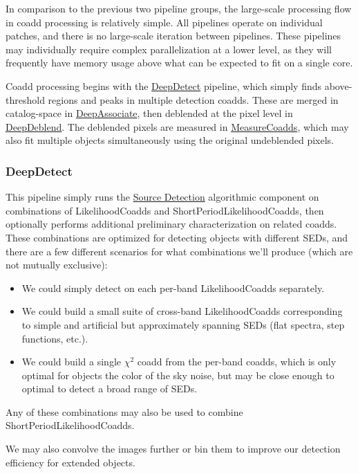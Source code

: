 In comparison to the previous two pipeline groups, the large-scale processing flow in coadd processing is relatively simple.  All pipelines operate on individual patches, and there is no large-scale iteration between pipelines.  These pipelines may individually require complex parallelization at a lower level, as they will frequently have memory usage above what can be expected to fit on a single core.

Coadd processing begins with the \hyperref[sec:drpDeepDetect]{DeepDetect} pipeline, which simply finds above-threshold regions and peaks in multiple detection coadds.  These are merged in catalog-space in \hyperref[sec:drpDeepAssociate]{DeepAssociate}, then deblended at the pixel level in \hyperref[sec:drpDeepDeblend]{DeepDeblend}.  The deblended pixels are measured in \hyperref[sec:drpMeasureCoadds]{MeasureCoadds}, which may also fit multiple objects simultaneously using the original undeblended pixels.

\subsubsection{DeepDetect}
\label{sec:drpDeepDetect}

This pipeline simply runs the \hyperref[sec:acSourceDetection]{Source Detection} algorithmic component on combinations of LikelihoodCoadds and ShortPeriodLikelihoodCoadds, then optionally performs additional preliminary characterization on related coadds.  These combinations are optimized for detecting objects with different SEDs, and there are a few different scenarios for what combinations we'll produce (which are not mutually exclusive):
\begin{itemize}
\item We could simply detect on each per-band LikelihoodCoadds separately.
\item We could build a small suite of cross-band LikelihoodCoadds corresponding to simple and artificial but approximately spanning SEDs (flat spectra, step functions, etc.).
\item We could build a single $\chi^2$ coadd from the per-band coadds, which is only optimal for objects the color of the sky noise, but may be close enough to optimal to detect a broad range of SEDs.
\end{itemize}
Any of these combinations may also be used to combine ShortPeriodLikelihoodCoadds.

We may also convolve the images further or bin them to improve our detection efficiency for extended objects.

